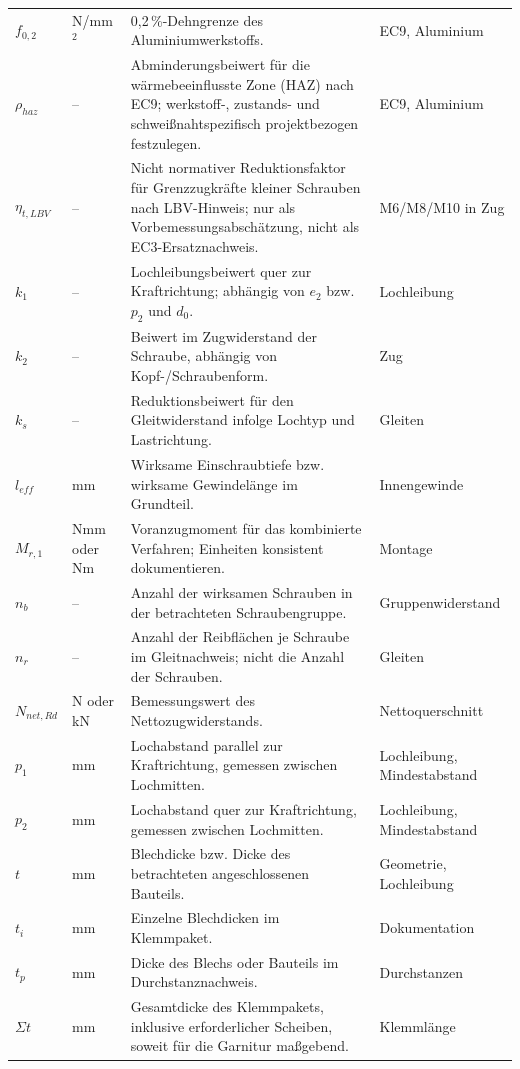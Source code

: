 \documentclass[10pt,a4paper]{article}
\begin{document}
\begin{longtable}{@{}p{25mm}p{24mm}p{82mm}p{24mm}@{}}
$f_{0,2}$ & N/mm$^2$ & 0,2\,\%-Dehngrenze des Aluminiumwerkstoffs. & EC9, Aluminium \\
$\rho_{haz}$ & -- & Abminderungsbeiwert für die wärmebeeinflusste Zone (HAZ) nach EC9; werkstoff-, zustands- und schweißnahtspezifisch projektbezogen festzulegen. & EC9, Aluminium \\
$\eta_{t,LBV}$ & -- & Nicht normativer Reduktionsfaktor für Grenzzugkräfte kleiner Schrauben nach LBV-Hinweis; nur als Vorbemessungsabschätzung, nicht als EC3-Ersatznachweis. & M6/M8/M10 in Zug \\
$k_1$ & -- & Lochleibungsbeiwert quer zur Kraftrichtung; abhängig von $e_2$ bzw. $p_2$ und $d_0$. & Lochleibung \\
$k_2$ & -- & Beiwert im Zugwiderstand der Schraube, abhängig von Kopf-/Schraubenform. & Zug \\
$k_s$ & -- & Reduktionsbeiwert für den Gleitwiderstand infolge Lochtyp und Lastrichtung. & Gleiten \\
$l_{eff}$ & mm & Wirksame Einschraubtiefe bzw. wirksame Gewindelänge im Grundteil. & Innengewinde \\
$M_{r,1}$ & Nmm oder Nm & Voranzugmoment für das kombinierte Verfahren; Einheiten konsistent dokumentieren. & Montage \\
$n_b$ & -- & Anzahl der wirksamen Schrauben in der betrachteten Schraubengruppe. & Gruppenwiderstand \\
$n_r$ & -- & Anzahl der Reibflächen je Schraube im Gleitnachweis; nicht die Anzahl der Schrauben. & Gleiten \\
$N_{net,Rd}$ & N oder kN & Bemessungswert des Nettozugwiderstands. & Nettoquerschnitt \\
$p_1$ & mm & Lochabstand parallel zur Kraftrichtung, gemessen zwischen Lochmitten. & Lochleibung, Mindestabstand \\
$p_2$ & mm & Lochabstand quer zur Kraftrichtung, gemessen zwischen Lochmitten. & Lochleibung, Mindestabstand \\
$t$ & mm & Blechdicke bzw. Dicke des betrachteten angeschlossenen Bauteils. & Geometrie, Lochleibung \\
$t_i$ & mm & Einzelne Blechdicken im Klemmpaket. & Dokumentation \\
$t_p$ & mm & Dicke des Blechs oder Bauteils im Durchstanznachweis. & Durchstanzen \\
$\Sigma t$ & mm & Gesamtdicke des Klemmpakets, inklusive erforderlicher Scheiben, soweit für die Garnitur maßgebend. & Klemmlänge \\

\end{longtable}
\end{document}
